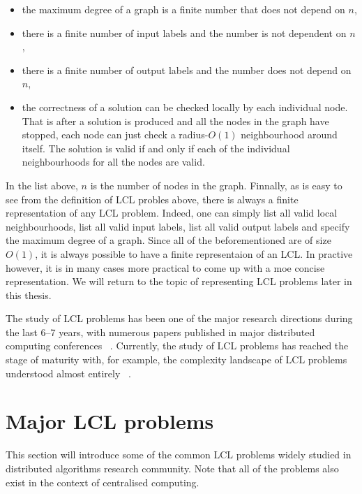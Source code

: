 \begin{itemize}

\item the maximum degree of a graph is a finite number that does not depend on $n$,

\item there is a finite number of input labels and the number is not dependent on $n$,

\item there is a finite number of output labels and the number does not depend on $n$,

\item the correctness of a solution can be checked locally by each individual node. That is
after a solution is produced and all the nodes in the graph have stopped, each node can just
check a radius-$O(1)$ neighbourhood around itself. The solution is valid if and only if each of
the individual neighbourhoods for all the nodes are valid.

\end{itemize}
In the list above, $n$ is the number of nodes in the graph. Finnally, as is easy to see from the definition of LCL
probles
above, there is always a finite representation of any LCL problem. Indeed, one can simply list
all valid local neighbourhoods, list all valid input labels, list all valid output
labels and specify the maximum degree of a graph. Since all of the beforementioned are
of size $O(1)$, it is always possible to have a finite representaion of an LCL.
In practive however, it is in many cases more practical to come up with
a moe concise representation. We will return to the topic of representing LCL
problems later in this thesis.

The study of LCL problems has been one of the major research directions
during the last 6--7 years, with numerous papers published in major
distributed computing conferences
~\cite{Balliu2016, Chang2016, Brandt2017, Chang2017, Fischer2017a, Rozhon2019, Balliu2020-1, Balliu2020-2}.
Currently, the study of LCL problems has reached the stage of maturity with,
for example, the complexity landscape of LCL problems understood
almost entirely ~\cite{Suomela2020, Chang2020a}.

\section{Major LCL problems}

This section will introduce some of the common LCL problems
widely studied in distributed algorithms research community.
Note that all of the problems also exist in the context of 
centralised computing.

